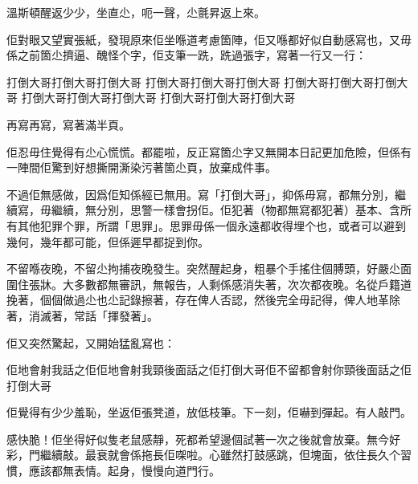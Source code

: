 溫斯頓醒返少少，坐直尐，呃一聲，尐氈昇返上來。

佢對眼又望實張紙，發現原來佢坐喺道考慮箇陣，佢又喺都好似自動感寫也，又毋係之前箇尐擠逼、醜怪个字，佢支筆一跣，跣過張字，寫著一行又一行：

	打倒大哥打倒大哥打倒大哥
	打倒大哥打倒大哥打倒大哥
	打倒大哥打倒大哥打倒大哥
	打倒大哥打倒大哥打倒大哥
	打倒大哥打倒大哥打倒大哥

再寫再寫，寫著滿半頁。

佢忍毋住覺得有尐心慌慌。都罷啦，反正寫箇尐字又無開本日記更加危險，但係有一陣間佢驚到好想撕開澌染污著箇尐頁，放棄成件事。

不過佢無感做，因爲佢知係經已無用。寫「打倒大哥」，抑係毋寫，都無分別，繼續寫，毋繼續，無分別，思警一樣會拐佢。佢犯著（物都無寫都犯著）基本、含所有其他犯罪个罪，所謂「思罪」。思罪毋係一個永遠都收得埋个也，或者可以避到幾何，幾年都可能，但係遲早都捉到你。

不留喺夜晚，不留尐拘捕夜晚發生。突然醒起身，粗暴个手搖住個膊頭，好嚴尐面圍住張牀。大多數都無審訊，無報告，人剩係感消失著，次次都夜晚。名從戶籍道挽著，個個做過尐也尐記錄擦著，存在俾人否認，然後完全毋記得，俾人地革除著，消滅著，常話「揮發著」。

佢又突然驚起，又開始猛亂寫也：

佢地會射我話之佢佢地會射我頸後面話之佢打倒大哥佢不留都會射你頸後面話之佢打倒大哥

佢覺得有少少羞恥，坐返佢張凳道，放低枝筆。下一刻，佢嚇到彈起。有人敲門。

感快脆！佢坐得好似隻老鼠感靜，死都希望邊個試著一次之後就會放棄。無今好彩，門繼續敲。最衰就會係拖長佢㗎啦。心雖然打鼓感跳，但塊面，依住長久个習慣，應該都無表情。起身，慢慢向道門行。
